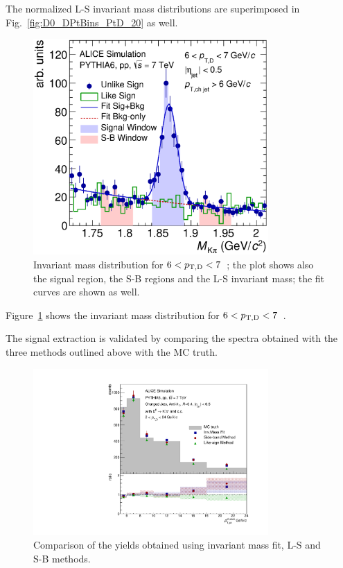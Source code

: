 The normalized L-S invariant mass distributions are superimposed in Fig.~\ref{fig:D0_DPtBins_PtD_20} as well.
\begin{figure}[tbh]
\begin{center}
\includegraphics[width=0.8\textwidth]{img/HQ16_Simulation_InvMass}
 \caption{Invariant mass distribution for $6 < p_{\mathrm{T,D}} < 7$~\GeVc; the plot shows also the signal region, the S-B regions and the L-S invariant mass; the fit curves are shown as well.} 
 \label{fig:HQ16_Simulation_InvMass}
\end{center}
\end{figure}
Figure~\ref{fig:HQ16_Simulation_InvMass} shows the invariant mass distribution for $6 < p_{\mathrm{T,D}} < 7$~\GeVc. 

The signal extraction is validated by comparing the spectra obtained with the three methods outlined above with the MC truth. 
\begin{figure}[tbh]
\begin{center}
\includegraphics[width=0.8\textwidth]{img/HQ16_Simulation_MethodComparison}
 \caption{Comparison of the yields obtained using invariant mass fit, L-S and S-B methods.} 
 \label{fig:HQ16_Simulation_MethodComparison}
\end{center}
\end{figure}

